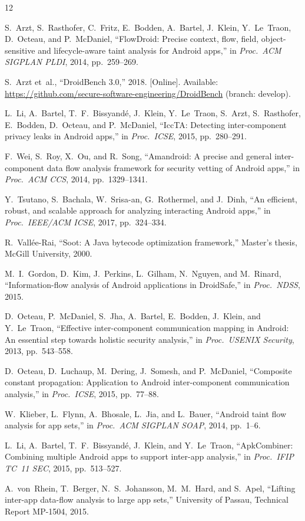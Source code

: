 \documentclass[conference]{IEEEtran}
\begin{document}
\begin{thebibliography}{12}

S.~Arzt, S.~Rasthofer, C.~Fritz, E.~Bodden, A.~Bartel, J.~Klein,
Y.~Le~Traon, D.~Octeau, and P.~McDaniel,
``FlowDroid: Precise context, flow, field, object-sensitive and lifecycle-aware
taint analysis for Android apps,''
in \emph{Proc.\ ACM SIGPLAN PLDI}, 2014, pp.~259--269.

S.~Arzt et~al.,
``DroidBench 3.0,'' 2018. [Online]. Available:
\url{https://github.com/secure-software-engineering/DroidBench}
(branch: develop).

L.~Li, A.~Bartel, T.~F.~Bissyand\'{e}, J.~Klein, Y.~Le~Traon, S.~Arzt,
S.~Rasthofer, E.~Bodden, D.~Octeau, and P.~McDaniel,
``IccTA: Detecting inter-component privacy leaks in Android apps,''
in \emph{Proc.\ ICSE}, 2015, pp.~280--291.

F.~Wei, S.~Roy, X.~Ou, and R.~Song,
``Amandroid: A precise and general inter-component data flow analysis framework
for security vetting of Android apps,''
in \emph{Proc.\ ACM CCS}, 2014, pp.~1329--1341.

Y.~Tsutano, S.~Bachala, W.~Srisa-an, G.~Rothermel, and J.~Dinh,
``An efficient, robust, and scalable approach for analyzing interacting Android
apps,''
in \emph{Proc.\ IEEE/ACM ICSE}, 2017, pp.~324--334.

R.~Vall\'{e}e-Rai,
``Soot: A Java bytecode optimization framework,''
Master's thesis, McGill University, 2000.

M.~I.~Gordon, D.~Kim, J.~Perkins, L.~Gilham, N.~Nguyen, and M.~Rinard,
``Information-flow analysis of Android applications in DroidSafe,''
in \emph{Proc.\ NDSS}, 2015.

D.~Octeau, P.~McDaniel, S.~Jha, A.~Bartel, E.~Bodden, J.~Klein, and
Y.~Le~Traon,
``Effective inter-component communication mapping in Android: An essential step
towards holistic security analysis,''
in \emph{Proc.\ USENIX Security}, 2013, pp.~543--558.

D.~Octeau, D.~Luchaup, M.~Dering, J.~Somesh, and P.~McDaniel,
``Composite constant propagation: Application to Android inter-component
communication analysis,''
in \emph{Proc.\ ICSE}, 2015, pp.~77--88.

W.~Klieber, L.~Flynn, A.~Bhosale, L.~Jia, and L.~Bauer,
``Android taint flow analysis for app sets,''
in \emph{Proc.\ ACM SIGPLAN SOAP}, 2014, pp.~1--6.

L.~Li, A.~Bartel, T.~F.~Bissyand\'{e}, J.~Klein, and Y.~Le~Traon,
``ApkCombiner: Combining multiple Android apps to support inter-app analysis,''
in \emph{Proc.\ IFIP TC~11 SEC}, 2015, pp.~513--527.

A.~von~Rhein, T.~Berger, N.~S.~Johansson, M.~M.~Hard, and S.~Apel,
``Lifting inter-app data-flow analysis to large app sets,''
University of Passau, Technical Report MP-1504, 2015.

\end{thebibliography}
\end{document}
